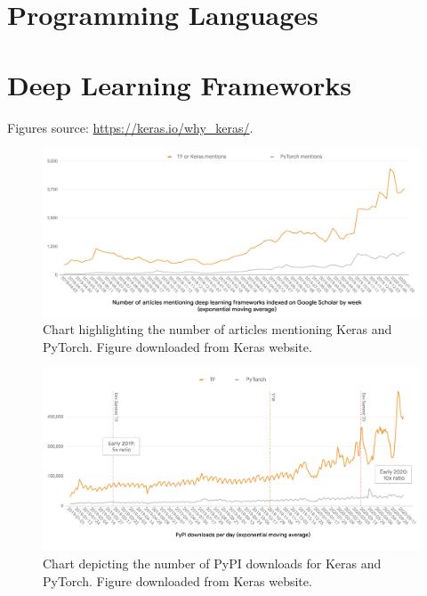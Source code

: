 \section{Programming Languages}
\label{sec:appendix-programming-languages-comparison}



\section{Deep Learning Frameworks}
\label{sec:appendix-keras_vs_pytorch}

Figures source: \url{https://keras.io/why_keras/}.

\begin{figure}[ht]
\centerline{\includegraphics[width=1.1\textwidth]{Dissertation/figures/appendix/keras_vs_pytorch_mentions.jpeg}}
\caption{Chart highlighting the number of articles mentioning Keras and PyTorch. Figure downloaded from Keras website.}
\end{figure}

\begin{figure}[ht]
\centerline{\includegraphics[width=1.1\textwidth]{Dissertation/figures/appendix/keras_vs_pytorch_downloads.jpg}}
\caption{Chart depicting the number of PyPI downloads for Keras and PyTorch. Figure downloaded from Keras website.}
\end{figure}